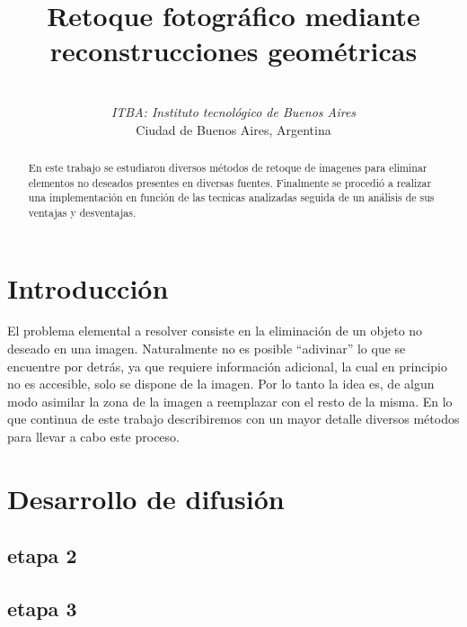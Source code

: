 \documentclass[conference]{IEEEtran}
\begin{document}
\title{Retoque fotográfico mediante reconstrucciones geométricas}
\author{
 \\
\textit{ITBA: Instituto tecnológico de Buenos Aires}\\
Ciudad de Buenos Aires, Argentina
}
\maketitle

\begin{abstract}
En este trabajo se estudiaron diversos métodos de retoque de imagenes para eliminar elementos no deseados presentes en diversas fuentes. Finalmente se procedió a realizar una implementación en función de las tecnicas analizadas seguida de un análisis de sus ventajas y desventajas.
\end{abstract}

\section{Introducción}
El problema elemental a resolver consiste en la eliminación de un objeto no deseado en una imagen.
Naturalmente no es posible ``adivinar'' lo que se encuentre por detrás, ya que requiere información adicional, la cual en principio no es accesible, solo se dispone de la imagen. Por lo tanto la idea es, de algun modo asimilar la zona de la imagen a reemplazar con el resto de la misma. En lo que continua de este trabajo describiremos con un mayor detalle diversos métodos para llevar a cabo este proceso.



\section{Desarrollo de difusión}




\subsection{etapa 2}

\subsection{etapa 3}
\end{document}
